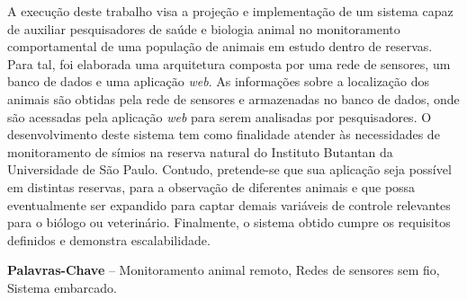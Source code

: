 \begin{resumo}

A execução deste trabalho visa a projeção e implementação de um sistema capaz de auxiliar pesquisadores de saúde e biologia animal no monitoramento comportamental de uma população de animais em estudo dentro de reservas. Para tal, foi elaborada uma arquitetura composta por uma rede de sensores, um banco de dados e uma aplicação \emph{web}. As informações sobre a localização dos animais são obtidas pela rede de sensores e armazenadas no banco de dados, onde são acessadas pela aplicação \emph{web} para serem analisadas por pesquisadores. O desenvolvimento deste sistema tem como finalidade atender às necessidades de monitoramento de símios na reserva natural do Instituto Butantan da Universidade de São Paulo. Contudo, pretende-se que sua aplicação seja possível em distintas reservas, para a observação de diferentes animais e que possa eventualmente ser expandido para captar demais variáveis de controle relevantes para o biólogo ou veterinário. Finalmente, o sistema obtido cumpre os requisitos definidos e demonstra escalabilidade.

\textbf{Palavras-Chave} -- Monitoramento animal remoto, Redes de sensores sem fio, Sistema embarcado.
\end{resumo}

